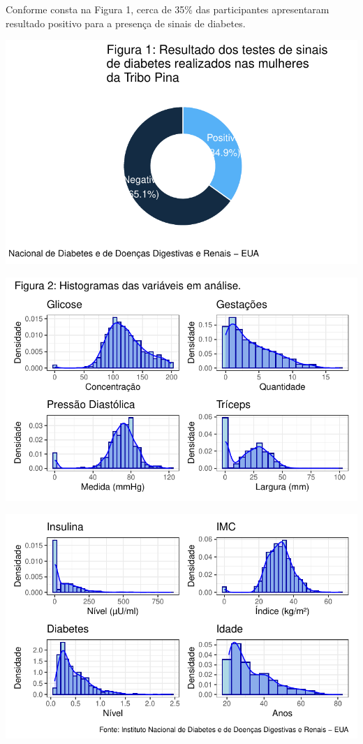 \documentclass[
  letterpaper,
  DIV=11,
  numbers=noendperiod]{scrartcl}
\begin{document}
Conforme consta na Figura 1, cerca de 35\% das participantes
apresentaram resultado positivo para a presença de sinais de diabetes.

\includegraphics{relatorio_lab1_files/figure-pdf/unnamed-chunk-3-1.pdf}

\includegraphics{relatorio_lab1_files/figure-pdf/unnamed-chunk-4-1.pdf}

\includegraphics{relatorio_lab1_files/figure-pdf/unnamed-chunk-4-2.pdf}
\end{document}
